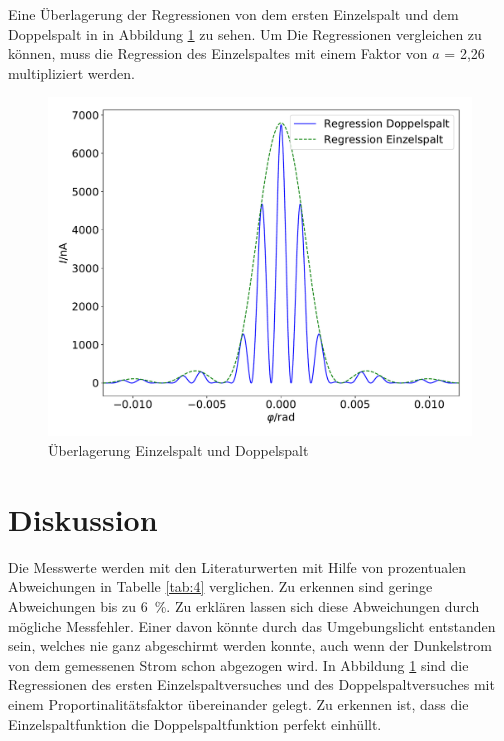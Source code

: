 Eine Überlagerung der Regressionen von dem ersten Einzelspalt und dem Doppelspalt in in Abbildung \ref{Abb:4} zu sehen. Um Die Regressionen vergleichen zu können,
muss die Regression des Einzelspaltes mit einem Faktor von $a$ = 2,26 multipliziert werden.

\begin{figure}
  \centering
  \includegraphics[scale= 0.5]{doppeleinzel.pdf}
  \caption{Überlagerung Einzelspalt und Doppelspalt}
  \label{Abb:4}
\end{figure}

\section{Diskussion}

Die Messwerte werden mit den Literaturwerten mit Hilfe von prozentualen Abweichungen in Tabelle \ref{tab:4} verglichen. Zu erkennen sind geringe Abweichungen bis zu
\SI{6}{\percent}. Zu erklären lassen sich diese Abweichungen durch mögliche Messfehler. Einer davon könnte durch das Umgebungslicht entstanden sein, welches
nie ganz abgeschirmt werden konnte, auch wenn der Dunkelstrom von dem gemessenen Strom schon abgezogen wird.
In Abbildung \ref{Abb:4} sind die Regressionen des ersten Einzelspaltversuches und des Doppelspaltversuches mit einem Proportinalitätsfaktor übereinander gelegt.
Zu erkennen ist, dass die Einzelspaltfunktion die Doppelspaltfunktion perfekt einhüllt.

